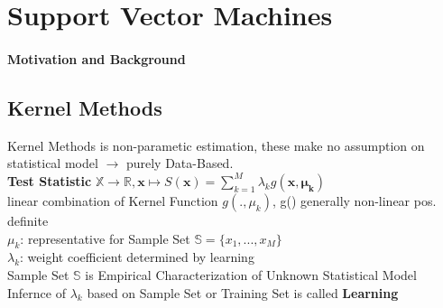\section{Support Vector Machines}

\paragraph{Motivation and Background}
\begin{sectionbox}

	\subsection{Kernel Methods} 
	Kernel Methods is non-parametic estimation, these make no assumption on statistical model $\rightarrow$ purely Data-Based. \\
	\textbf{Test Statistic} 
	$\boxed{\mathbb{X} \rightarrow \mathbb{R}, \mathbf{x}\mapsto S(\mathbf{x})= \sum_{k=1}^{M} \lambda_kg(\mathbf{x}, \mathbf{\mu_k})}$ \\
	linear combination of Kernel Function $g(.,\mu_k)$, g() generally non-linear pos. definite \\ %
	
	$\mu_k$: representative for Sample Set $\mathbb{S}=\{x_1,...,x_M\}$ \\  
	$\lambda_k$: weight coefficient determined by learning \\
	Sample Set $\mathbb{S}$ is Empirical Characterization of Unknown Statistical Model \\
	Infernce of $\lambda_k$ based on Sample Set or Training Set is called \textbf{Learning}

	
\end{sectionbox}

